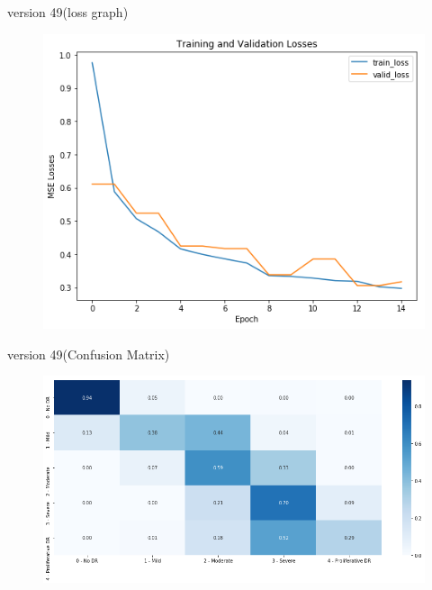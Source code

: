 \documentclass[10pt]{beamer}
\begin{document}
			\begin{frame}{version 49(loss graph)}
				\begin{figure}
					\includegraphics[scale=.5]{Results/v49lossgraph.png}
				\end{figure}
			\end{frame}
			\begin{frame}{version 49(Confusion Matrix)}
				\begin{figure}
					\includegraphics[width=\linewidth]{Results/v49wooptimizationconfusion.png}
				\end{figure}
			\end{frame}
\end{document}
